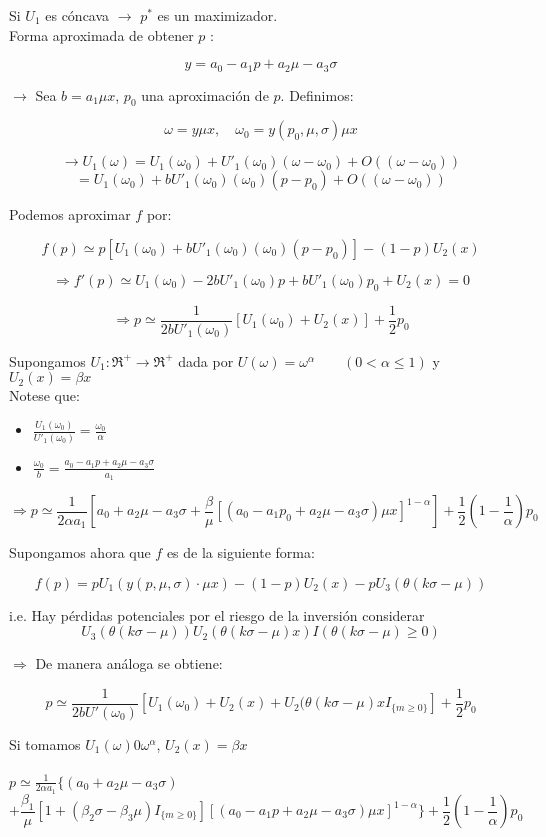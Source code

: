 Si $U_1$ es cóncava $\rightarrow$ $p^*$ es un maximizador.\\

 Forma aproximada de obtener $p$ :
 
 \[y=a_0-a_1p+a_2\mu-a_3\sigma\]
 
 $\rightarrow$ Sea $b=a_1\mu x$, $p_0$ una aproximación de $p$. Definimos:
 
 \[\omega=y\mu x,\quad \omega_0=y(p_0,\mu,\sigma)\mu x\]
 
 \[\rightarrow U_1(\omega)=U_1(\omega_0)+U'_1(\omega_0)(\omega-\omega_0)+O((\omega-\omega_0))\] 
 \[=U_1(\omega_0)+bU'_1(\omega_0)(\omega_0)(p-p_0)+O((\omega-\omega_0))\]
 
 Podemos aproximar $f$ por:
 
 \[f(p)\simeq p[U_1(\omega_0)+bU'_1(\omega_0)(\omega_0)(p-p_0)]-(1-p)U_2(x)\]
 
 \[\Rightarrow f'(p)\simeq U_1(\omega_0)-2bU'_1(\omega_0)p+bU'_1(\omega_0)p_0+U_2(x)=0\]
 
 \[\Rightarrow p\simeq \frac{1}{2bU'_1(\omega_0)}[U_1(\omega_0)+U_2(x)]+\frac{1}{2}p_0\]
 
Supongamos $U_1:\Re^+ \rightarrow \Re^+$ dada por $U(\omega)=\omega^\alpha\qquad(0<\alpha\le1)$ y $U_2(x)=\beta x$\\

Notese que:
\begin{itemize}
 \item ${\displaystyle\frac{U_1(\omega_0)}{U'_1(\omega_0)}=\frac{\omega_0}{\alpha}}$
 \item ${\displaystyle\frac{\omega_0}{b}=\frac{a_0-a_1p+a_2\mu-a_3\sigma}{a_1}}$
\end{itemize}

\[\Rightarrow p\simeq \frac{1}{2\alpha a_1}[a_0+a_2\mu-a_3\sigma+\frac{\beta}{\mu}[(a_0-a_1p_0+a_2\mu-a_3\sigma)\mu x]^{1-\alpha}]+\frac{1}{2}(1-\frac{1}{\alpha})p_0\]
 
Supongamos ahora que $f$ es de la siguiente forma:

\[f(p)=pU_1(y(p,\mu,\sigma)\cdot \mu x)-(1-p)U_2(x)-pU_3(\theta(k\sigma-\mu))\]
 
i.e. Hay pérdidas potenciales por el riesgo de la inversión considerar
\[U_3(\theta(k\sigma-\mu))U_2(\theta(k\sigma-\mu)x)I(\theta(k\sigma-\mu)\ge 0)\]
 
$\Rightarrow$ De manera análoga se obtiene:

\[p\simeq\frac{1}{2bU'(\omega_0)}[U_1(\omega_0)+U_2(x)+U_2(\theta(k\sigma-\mu)xI_{\{m\ge0\}}]+\frac{1}{2}p_0\]
 
\newpage 
Si tomamos $U_1(\omega)0\omega^\alpha$, $U_2(x)=\beta x$ \\\\
 
$p\simeq \frac{1}{2\alpha a_1}\{(a_0+a_2\mu-a_3\sigma)$
\[+\frac{\beta_1}{\mu}[1+(\beta_2\sigma-\beta_3 \mu)I_{\{m\ge0\}}][(a_0-a_1p+a_2\mu-a_3\sigma)\mu x]^{1-\alpha}\}+\frac{1}{2}(1-\frac{1}{\alpha})p_0\] 
 